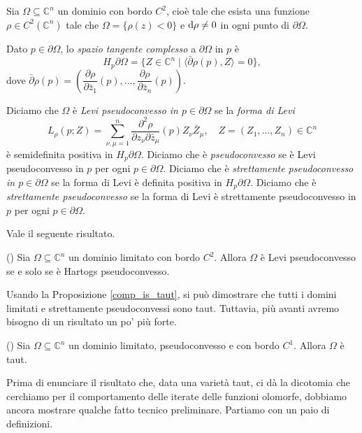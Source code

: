 \begin{defn}
    Sia $\Omega \subseteq \mathbb{C}^n$ un dominio con bordo $C^2$, cioè tale che esista una funzione $\rho \in C^2(\mathbb{C}^n)$ tale che $\Omega=\{\rho(z)<0\}$ e $\mathop{}\!\mathrm{d}\rho\not=0$ in ogni punto di $\partial\Omega$.
    
    Dato $p \in \partial\Omega$, lo \textit{spazio tangente complesso} a $\partial\Omega$ in $p$ è
    $$H_p\partial\Omega=\{Z \in \mathbb{C}^n \mid \langle \bar{\partial}\rho(p),Z\rangle=0\},$$
    dove $\bar{\partial}\rho(p)=\left(\dfrac{\partial\rho}{\partial\bar{z}_1}(p),\dots,\dfrac{\partial\rho}{\partial\bar{z}_n}(p)\right)$.

    Diciamo che $\Omega$ è \textit{Levi pseudoconvesso in $p\in\partial\Omega$} se la \textit{forma di Levi}
    $$L_{\rho}(p;Z)=\sum_{\nu,\mu=1}^n \frac{\partial^2\rho}{\partial z_\nu\partial\bar{z}_\mu}(p)Z_\nu\bar{Z}_\mu, \quad Z=(Z_1,\dots,Z_n) \in \mathbb{C}^n$$
      è semidefinita positiva in $H_p\partial\Omega$. Diciamo che è \textit{pseudoconvesso} se è Levi pseudoconvesso in $p$ per ogni $p \in \partial\Omega$. Diciamo che è \textit{strettamente pseudoconvesso in $p\in\partial\Omega$} se la forma di Levi è definita positiva in $H_p\partial\Omega$. Diciamo che è \textit{strettamente pseudoconvesso} se la forma di Levi è strettamente pseudoconvesso in $p$ per ogni $p \in \partial\Omega$.
\end{defn}

Vale il seguente risultato.
\begin{thm}
    (\cite[Theorem 3.3.5]{Kr}) Sia $\Omega \subseteq \mathbb{C}^n$ un dominio limitato con bordo $C^2$. Allora $\Omega$ è Levi pseudoconvesso se e solo se è Hartogs pseudoconvesso.
    \vspace*{-\baselineskip}
\end{thm}

Usando la Proposizione \ref{comp_is_taut}, si può dimostrare che tutti i domini limitati e strettamente pseudoconvessi sono taut. Tuttavia, più avanti avremo bisogno di un risultato un po' più forte.

\begin{prop} \label{psdcvx_is_taut}
    (\cite[Proposition 2]{KR}) Sia $\Omega\subseteq\mathbb{C}^n$ un dominio limitato, pseudoconvesso e con bordo $C^1$. Allora $\Omega$ è taut.
\end{prop}

Prima di enunciare il risultato che, data una varietà taut, ci dà la dicotomia che cerchiamo per il comportamento delle iterate delle funzioni olomorfe, dobbiamo ancora mostrare qualche fatto tecnico preliminare. Partiamo con un paio di definizioni.

